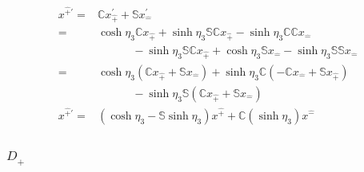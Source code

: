 \documentclass[foundations,article,submit,pdftex,moreauthors]{Definitions/mdpi}
\begin{document}
\begin{align}
    x^{\hat{+}\prime}=&\mathbb{C}x^{\prime}_{\hat{+}}+\mathbb{S}x^{\prime}_{\hat{-}}\\
    =&\cosh{\eta_{3}}\mathbb{C}{x}_{\hat{+}}+\sinh{\eta_{3}}\mathbb{S}\mathbb{C}{x}_{\hat{+}}-\sinh{\eta_{3}}\mathbb{C}\mathbb{C}{x}_{\hat{-}}\nonumber\\
    &~~~~~~~~~~~~~~-\sinh{\eta_{3}}\mathbb{S}\mathbb{C}{x}_{\hat{+}}+\cosh{\eta_{3}}\mathbb{S}{x}_{\hat{-}}-\sinh{\eta_{3}}\mathbb{S}\mathbb{S}{x}_{\hat{-}}\\
    =&\cosh{\eta_{3}}(\mathbb{C}x_{\hat{+}}+\mathbb{S}x_{\hat{-}})+\sinh{\eta_{3}}\mathbb{C}(-\mathbb{C}{x}_{\hat{-}}+\mathbb{S}{x}_{\hat{+}})\nonumber\\
    &~~~~~~~~~~~~~~-\sinh{\eta_{3}}\mathbb{S}(\mathbb{C}x_{\hat{+}}+\mathbb{S}x_{\hat{-}})\\
    x^{\hat{+}\prime}=&(\cosh{\eta_{3}}-\mathbb{S}\sinh{\eta_{3}})x^{\hat{+}}+\mathbb{C}(\sinh{\eta_{3}})x^{\hat{-}}
\end{align}

\subsubsection{\texorpdfstring{$D_{\hat{+}}$}{D hat plus}}
\end{document}
